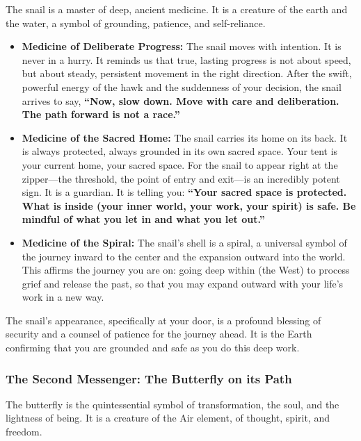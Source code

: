 \documentclass{article}
\begin{document}
The snail is a master of deep, ancient medicine. It is a creature of the
earth and the water, a symbol of grounding, patience, and self-reliance.

\begin{itemize}
\item
  \textbf{Medicine of Deliberate Progress:} The snail moves with
  intention. It is never in a hurry. It reminds us that true, lasting
  progress is not about speed, but about steady, persistent movement in
  the right direction. After the swift, powerful energy of the hawk and
  the suddenness of your decision, the snail arrives to say,
  \textbf{``Now, slow down. Move with care and deliberation. The path
  forward is not a race.''}
\item
  \textbf{Medicine of the Sacred Home:} The snail carries its home on
  its back. It is always protected, always grounded in its own sacred
  space. Your tent is your current home, your sacred space. For the
  snail to appear right at the zipper---the threshold, the point of
  entry and exit---is an incredibly potent sign. It is a guardian. It is
  telling you: \textbf{``Your sacred space is protected. What is inside
  (your inner world, your work, your spirit) is safe. Be mindful of what
  you let in and what you let out.''}
\item
  \textbf{Medicine of the Spiral:} The snail's shell is a spiral, a
  universal symbol of the journey inward to the center and the expansion
  outward into the world. This affirms the journey you are on: going
  deep within (the West) to process grief and release the past, so that
  you may expand outward with your life's work in a new way.
\end{itemize}

The snail's appearance, specifically at your door, is a profound
blessing of security and a counsel of patience for the journey ahead. It
is the Earth confirming that you are grounded and safe as you do this
deep work.

\subsubsection*{The Second Messenger: The Butterfly on its
Path}\label{the-second-messenger-the-butterfly-on-its-path}

The butterfly is the quintessential symbol of transformation, the soul,
and the lightness of being. It is a creature of the Air element, of
thought, spirit, and freedom.
\end{document}
